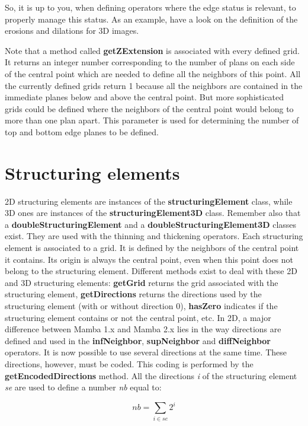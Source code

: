 \documentclass[a4paper,10pt,oneside]{article}
\begin{document}
So, it is up to you, when defining operators where the edge status is relevant, to properly manage this status. As an example, have a look on the
definition of the erosions and dilations for 3D images.

Note that a method called \textbf{getZExtension} is associated with every defined grid. It returns an integer number corresponding to
the number of plans on each side of the central point which are needed to define all the neighbors of this point. All the currently
defined grids return 1 because all the neighbors are contained in the immediate planes below and above the central point. But more
sophisticated grids could be defined where the neighbors of the central point would belong to more than one plan apart. This parameter is
used for determining the number of top and bottom edge planes to be defined.
 
\section{Structuring elements}
\label{cha:structelem}
2D structuring elements are instances of the \textbf{structuringElement} class, while 3D ones are instances of the \textbf{structuringElement3D}
class. Remember also that a \textbf{doubleStructuringElement} and a \textbf{doubleStructuringElement3D} classes exist. They are used with
the thinning and thickening operators.
Each structuring element is associated to a grid. It is defined by the neighbors of the central point it contains. Its origin is always
the central point, even when this point does not belong to the structuring element. Different methods exist to deal with these 2D and
3D structuring elements: \textbf{getGrid} returns the grid associated with the structuring element, \textbf{getDirections} returns the
directions used by the structuring element (with or without direction 0), \textbf{hasZero} indicates if the structuring element contains
or not the central point, etc.
In 2D, a major difference between Mamba 1.x and Mamba 2.x lies in the way directions are defined and used in the \textbf{infNeighbor}, \textbf{supNeighbor}
and \textbf{diffNeighbor} operators. It is now possible to use several directions at the same time. These directions, however, must be coded.
This coding is performed by the \textbf{getEncodedDirections} method. All the directions \emph{i} of the structuring element \emph{se} are used to define a
number \emph{nb} equal to:

\begin{displaymath}
nb = \sum_{i \in se} 2^i
\end{displaymath}
\end{document}

